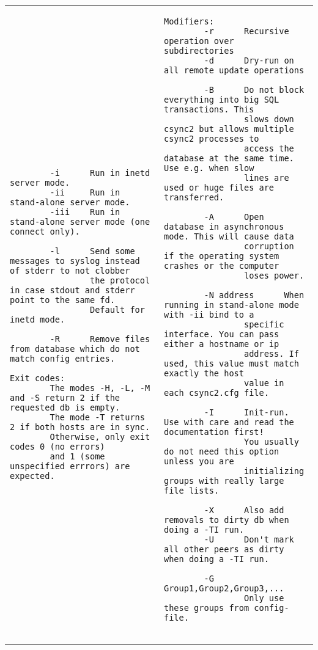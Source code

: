 \documentclass[a4paper,twocolumn]{article}
\begin{document}
\begin{figure*}[t]
\begin{center}
\begin{tabular}{|p{0.5\linewidth}|p{0.5\linewidth}|}
\begin{tiny}
\begin{verbatim}
        -i      Run in inetd server mode.
        -ii     Run in stand-alone server mode.
        -iii    Run in stand-alone server mode (one connect only).

        -l      Send some messages to syslog instead of stderr to not clobber
                the protocol in case stdout and stderr point to the same fd.
                Default for inetd mode.

        -R      Remove files from database which do not match config entries.

Exit codes:
        The modes -H, -L, -M and -S return 2 if the requested db is empty.
        The mode -T returns 2 if both hosts are in sync.
        Otherwise, only exit codes 0 (no errors)
        and 1 (some unspecified errrors) are expected.
\end{verbatim}
\end{tiny}

&

\begin{tiny}
\begin{verbatim}
Modifiers:
        -r      Recursive operation over subdirectories
        -d      Dry-run on all remote update operations

        -B      Do not block everything into big SQL transactions. This
                slows down csync2 but allows multiple csync2 processes to
                access the database at the same time. Use e.g. when slow
                lines are used or huge files are transferred.

        -A      Open database in asynchronous mode. This will cause data
                corruption if the operating system crashes or the computer
                loses power.

        -N address      When running in stand-alone mode with -ii bind to a
                specific interface. You can pass either a hostname or ip
                address. If used, this value must match exactly the host
                value in each csync2.cfg file.

        -I      Init-run. Use with care and read the documentation first!
                You usually do not need this option unless you are
                initializing groups with really large file lists.

        -X      Also add removals to dirty db when doing a -TI run.
        -U      Don't mark all other peers as dirty when doing a -TI run.

        -G Group1,Group2,Group3,...
                Only use these groups from config-file.


\end{verbatim}
\end{tiny}
\end{tabular}
\end{center}
\end{figure*}
\end{document}
